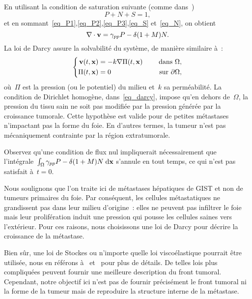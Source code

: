 \documentclass[main.tex]{subfiles}
\begin{document}
En utilisant la condition de saturation suivante 
(comme dans~\cite{ambrosi2002})
\begin{equation}\label{eq_saturation}
P+N+S=1,
\end{equation}
et en sommant~\eqref{eq_P1},\eqref{eq_P2},\eqref{eq_P3},\eqref{eq_S} et~\eqref{eq_N},
on obtient 
\begin{equation}\label{eq_divv}
\nabla\cdot \mathbf{v} = \gamma_{pp} P - \delta (1+M)N.
\end{equation}
La loi de Darcy assure la solvabilité du système, de manière similaire à~\cite{Ribba2006532}:
\begin{equation}\label{eq_darcy}
\left\{
\begin{aligned}
\mathbf{v}(t,\mathbf{x}) &=-k\nabla \Pi(t,\mathbf{x}) & \quad \textrm{ dans }  \Omega , \\
\Pi(t,\mathbf{x}) &=0 & \quad \textrm{ sur  } \partial \Omega,
\end{aligned}
\right.
\end{equation}
où~$\Pi$ est la pression (ou le potentiel) du milieu et~$k$ sa perméabilité. La condition de Dirichlet homogène, dans~\eqref{eq_darcy}, impose qu'en dehors de~$\Omega$, la pression du tissu sain ne soit pas modifiée par la pression générée par la croissance tumorale. Cette hypothèse est valide pour de petites métastases n'impactant pas la forme du foie. En d'autres termes, la tumeur n'est pas mécaniquement contrainte par la région extratumorale. 


Observez qu'une condition de flux nul impliquerait nécessairement que l'intégrale~$\int_{\Omega} \gamma_{pp} P - \delta (1+M)N \textrm{\;d}\mathbf{x}$ s'annule en tout temps, ce qui n'est pas satisfait à~$t=0$.


Nous soulignons que l'on traite ici de métastases hépatiques de GIST et non de tumeurs primaires du foie. Par conséquent, les cellules métastatiques ne grandissent pas dans leur milieu d'origine~: elles ne peuvent pas infiltrer le foie mais leur prolifération induit une pression qui pousse les cellules saines vers l'extérieur. Pour ces raisons, nous choisissons une loi de Darcy pour décrire la croissance de la métastase. 


Bien sûr, une loi de Stockes ou n'importe quelle loi viscoélastique pourrait être utilisée, nous en référons à~\cite{Bresch2009}  et~\cite{ambrosi2002,byrne2003} pour plus de détails. De telles lois plus compliquées peuvent fournir une meilleure description du front tumoral. Cependant, notre objectif ici n'est pas de fournir précisément le front tumoral ni la forme de la tumeur mais de reproduire la structure interne de la métastase.
\end{document}
